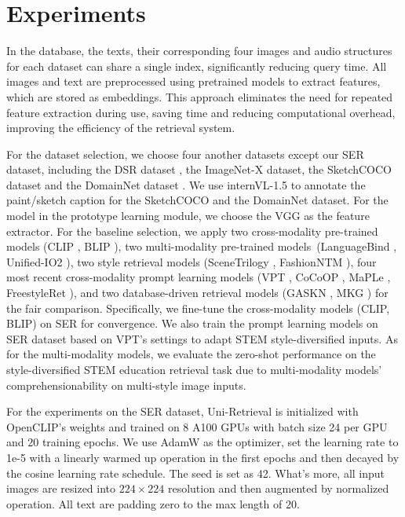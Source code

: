 \section{Experiments}
\label{supsubsec:Experiment Settings}


In the database, the texts, their corresponding four images and audio structures for each dataset can share a single index, significantly reducing query time. All images and text are preprocessed using pretrained models to extract features, which are stored as embeddings. This approach eliminates the need for repeated feature extraction during use, saving time and reducing computational overhead, improving the efficiency of the retrieval system.

For the dataset selection, we choose four another datasets except our SER dataset, including the DSR dataset \cite{li2025freestyleret}, the ImageNet-X dataset, the SketchCOCO dataset \cite{gao2020sketchycoco} and the DomainNet dataset \cite{peng2019moment}. We use internVL-1.5 \cite{Chen_2024_CVPR} to annotate the paint/sketch caption for the SketchCOCO and the DomainNet dataset. For the model in the prototype learning module, we choose the VGG \cite{vgg} as the feature extractor. For the baseline selection, we apply two cross-modality pre-trained models (CLIP \cite{clip}, BLIP \cite{blip}), two multi-modality pre-trained models~(LanguageBind \cite{languagebind}, Unified-IO2 \cite{uio2}), two style retrieval models (SceneTrilogy \cite{scenetrilogy}, FashionNTM \cite{fashionntm}), four most recent cross-modality prompt learning models (VPT \cite{jia2022visual}, CoCoOP \cite{zhou2022conditional}, MaPLe \cite{khattak2023maple}, FreestyleRet \cite{li2025freestyleret}), and two database-driven retrieval models (GASKN \cite{GASKN}, MKG \cite{mkg}) for the fair comparison. Specifically, we fine-tune the cross-modality models (CLIP, BLIP) on SER for convergence. We also train the prompt learning models on SER dataset based on VPT's settings to adapt STEM style-diversified inputs. As for the multi-modality models, we evaluate the zero-shot performance on the style-diversified STEM education retrieval task due to multi-modality models' comprehensionability on multi-style image inputs.

For the experiments on the SER dataset, Uni-Retrieval is initialized with OpenCLIP's weights and trained on 8 A100 GPUs with batch size 24 per GPU and 20 training epochs. We use AdamW as the optimizer, set the learning rate to 1e-5 with a linearly warmed up operation in the first epochs and then decayed by the cosine learning rate schedule. The seed is set as 42. What's more, all input images are resized into $224\times224$ resolution and then augmented by normalized operation. All text are padding zero to the max length of 20.

